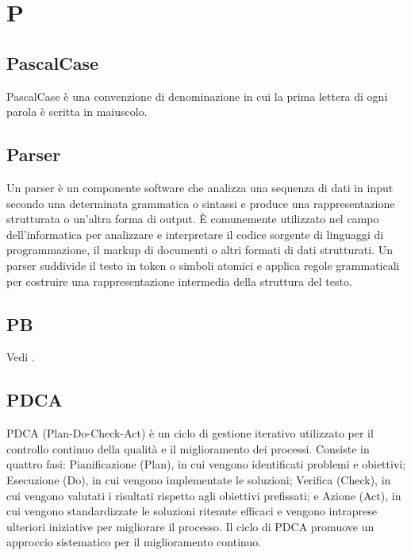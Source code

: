\section{P}

\vspace{2em}
\subsection*{PascalCase}
\par PascalCase è una convenzione di denominazione in cui la prima lettera di ogni parola è scritta in maiuscolo.

\vspace{2em}
\subsection*{Parser}
\par Un parser è un componente software che analizza una sequenza di dati in input secondo una determinata grammatica o sintassi e produce una rappresentazione strutturata o un'altra forma di output. È comunemente utilizzato nel campo dell'informatica per analizzare e interpretare il codice sorgente di linguaggi di programmazione, il markup di documenti o altri formati di dati strutturati. Un parser suddivide il testo in token o simboli atomici e applica regole grammaticali per costruire una rappresentazione intermedia della struttura del testo.

\vspace{2em}
\subsection*{PB}
\par Vedi .

\vspace{2em}
\subsection*{PDCA}
\par PDCA (Plan-Do-Check-Act) è un ciclo di gestione iterativo utilizzato per il controllo continuo della qualità e il miglioramento dei processi. Consiste in quattro fasi: Pianificazione (Plan), in cui vengono identificati problemi e obiettivi; Esecuzione (Do), in cui vengono implementate le soluzioni; Verifica (Check), in cui vengono valutati i risultati rispetto agli obiettivi prefissati; e Azione (Act), in cui vengono standardizzate le soluzioni ritenute efficaci e vengono intraprese ulteriori iniziative per migliorare il processo. Il ciclo di PDCA promuove un approccio sistematico per il miglioramento continuo.

